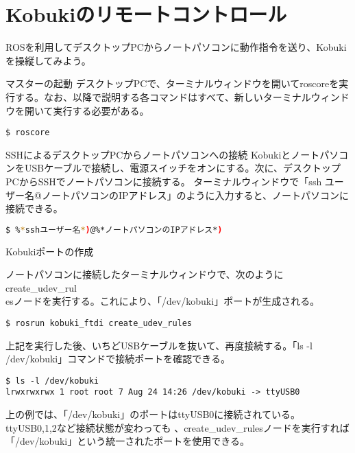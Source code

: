 \section{Kobukiのリモートコントロール}

\setcounter{num}{0}

ROSを利用してデスクトップPCからノートパソコンに動作指令を送り、Kobukiを操縦してみよう。

\circled{\thenum} マスターの起動
デスクトップPCで、ターミナルウィンドウを開いてroscoreを実行する。なお、以降で説明する各コマンドはすべて、新しいターミナルウィンドウを開いて実行する必要がある。

\begin{lstlisting}[language=ROS]
$ roscore
\end{lstlisting}

\circled{\thenum} SSHによるデスクトップPCからノートパソコンへの接続
KobukiとノートパソコンをUSBケーブルで接続し、電源スイッチをオンにする。次に、デスクトップPCからSSHでノートパソコンに接続する。  ターミナルウィンドウで「ssh ユーザー名@ノートパソコンのIPアドレス」のように入力すると、ノートパソコンに接続できる。

\begin{lstlisting}[language=bash]
$ %*sshユーザー名*)@%*ノートパソコンのIPアドレス*)
\end{lstlisting}

\circled{\thenum} Kobukiポートの作成

ノートパソコンに接続したターミナルウィンドウで、次のようにcreate\_udev\_rul\\esノードを実行する。これにより、「/dev/kobuki」ポートが生成される。

\begin{lstlisting}[language=ROS]
$ rosrun kobuki_ftdi create_udev_rules
\end{lstlisting}


上記を実行した後、いちどUSBケーブルを抜いて、再度接続する。「ls -l  /dev/kobuki」コマンドで接続ポートを確認できる。

\begin{lstlisting}[language=ROS]
$ ls -l /dev/kobuki
lrwxrwxrwx 1 root root 7 Aug 24 14:26 /dev/kobuki -> ttyUSB0
\end{lstlisting}


上の例では、「/dev/kobuki」のポートはttyUSB0に接続されている。ttyUSB0,1,2など接続状態が変わっても   、create\_udev\_rulesノードを実行すれば「/dev/kobuki」という統一されたポートを使用できる。\\

